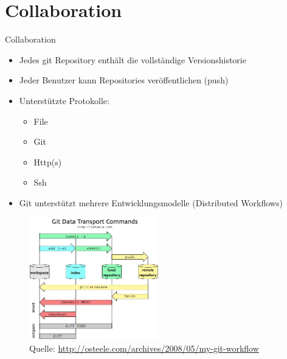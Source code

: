 \section{Collaboration}

\begin{frame}
  \tableofcontents[currentsection]
\end{frame}

\begin{frame}{Collaboration}
  \begin{itemize}
    \item Jedes git Repository enthält die vollständige Versionshistorie
    \item Jeder Benutzer kann Repositories veröffentlichen (push)
    \item Unterstützte Protokolle:
    \begin{itemize}
      \item File
      \item Git
      \item Http(s)
      \item Ssh
    \end{itemize}
    \item Git unterstützt mehrere Entwicklungsmodelle (Distributed Workflows)
  \end{itemize}
\end{frame}

\begin{frame}
  \begin{figure}
    \includegraphics[width=0.5\textwidth]{img/git-transport}
    \caption[format=empty]{Quelle: \url{http://osteele.com/archives/2008/05/my-git-workflow}}
  \end{figure}
  
\end{frame}

